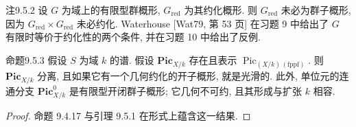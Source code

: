 \begin{origstatement}{注}{9.5.2}\label{ch09s05:rem9.5.2}
设 $G$ 为域上的有限型群概形, $G_{\mathrm{red}}$ 为其约化概形. 则 $G_{\mathrm{red}}$ 未必为群子概形, 因为 $G_{\mathrm{red}}\times G_{\mathrm{red}}$ 未必约化. Waterhouse [Wat79, 第 53 页] 在习题 9 中给出了 $G$ 有限时等价于约化性的两个条件, 并在习题 10 中给出了反例.
\end{origstatement}

\begin{origstatement}{命题}{9.5.3}\label{ch09s05:prop9.5.3}
假设 $S$ 为域 $k$ 的谱. 假设 $\mathbf{Pic}_{X/k}$ 存在且表示 $\operatorname{Pic}_{(X/k)\,\mathrm{(fppf)}}$. 则 $\mathbf{Pic}_{X/k}$ 分离, 且如果它有一个几何约化的开子概形, 就是光滑的. 此外, 单位元的连通分支 $\mathbf{Pic}^0_{X/k}$ 是有限型开闭群子概形; 它几何不可约, 且其形成与扩张 $k$ 相容.
\end{origstatement}
\begin{proof}
命题 9.4.17 与引理 9.5.1 在形式上蕴含这一结果.
\end{proof}

